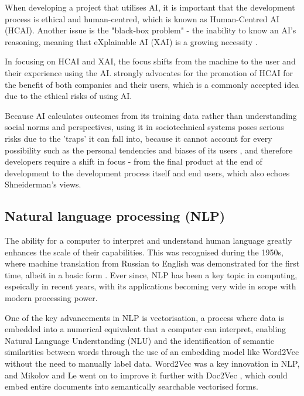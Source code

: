 \documentclass[12pt]{report}
\begin{document}
    When developing a project that utilises AI, it is important that the development process
    is ethical and human-centred, which is known as Human-Centred AI (HCAI). 
    Another issue is the "black-box problem" - the inability to know an AI's reasoning, meaning that 
    eXplainable AI (XAI) is a growing necessity \autocite{miro-nicolau_comprehensive_2025}. 
    
    In focusing on HCAI and XAI, the focus shifts from the machine to the user and their experience 
    using the AI. \textcite{AIEthics} strongly advocates for the 
    promotion of HCAI for the benefit of both companies and their users, which is a commonly accepted 
    idea due to the ethical risks of using AI. 
    
    Because AI calculates outcomes from its training data rather 
    than understanding social norms and perspectives, using it in sociotechnical systems poses serious risks 
    due to the 'traps' it can fall into, because it cannot account for every possibility such as the personal tendencies 
    and biases of its users \autocite{selbst_fairness_2019}, and therefore developers require a shift in focus - from the final product
    at the end of development to the development process itself and end users, which also echoes Shneiderman's views. 

    \subsection{Natural language processing (NLP)}
    The ability for a computer to interpret and understand human language greatly enhances the scale of their capabilities. This was 
    recognised during the 1950s, where machine translation from Russian to English was demonstrated for the first time, albeit in a basic form \autocite{zampolli_natural_1994}.
    Ever since, NLP has been a key topic in computing, espeically in recent years, with its applications becoming very wide 
    in scope with modern processing power.

    One of the key advancements in NLP is vectorisation, a process where data is embedded into a numerical equivalent that a computer can interpret, 
    enabling Natural Language Understanding (NLU) and the identification of semantic similarities between words through the use of an embedding model 
    like Word2Vec \autocite{mikolov_efficient_2013} without the need to manually label data. 
    Word2Vec was a key innovation in NLP, and Mikolov and Le went on to improve it further with Doc2Vec \autocite{le_distributed_2014}, which could embed 
    entire documents into semantically searchable vectorised forms.
    
\end{document}
